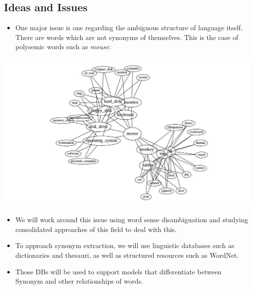 \documentclass[a0,portrait]{a0poster}
\begin{document}
\begin{multicols}{2}

\section*{Ideas and Issues}
\begin{itemize}
	\item One major issue is one regarding the ambiguous structure of language itself. There are words which are not synonyms of themselves. This is the case of polysemic words such as \textit{mouse}:
%
\end{itemize}

\begin{center}\vspace{1cm}
	\includegraphics[width=0.8\linewidth]{widdows2.jpg}
\end{center}\vspace{1cm}

\begin{itemize}
	\item 
	We will work around this issue using word sense disambiguation and studying consolidated approaches of this field to deal with this.\\
	
	\item To approach synonym extraction, we will use linguistic databases such as dictionaries and thesauri, as well as structured resources such as WordNet.\\
	
	\item Those DBs will be used to support models that differentiate between Synonym and other relationships of words.\\
	

\end{itemize}
\end{multicols}
\end{document}
